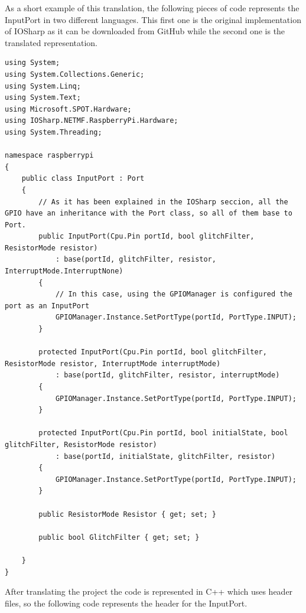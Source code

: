As a short example of this translation, the following pieces of code represents the InputPort in two different languages. This first one is the original implementation of IOSharp as it can be downloaded from GitHub while the second one is the translated representation.
\begin{lstlisting}[language=CSharp, caption={InputPort in C\#}]
using System;
using System.Collections.Generic;
using System.Linq;
using System.Text;
using Microsoft.SPOT.Hardware;
using IOSharp.NETMF.RaspberryPi.Hardware;
using System.Threading;

namespace raspberrypi
{
    public class InputPort : Port
    {
    	// As it has been explained in the IOSharp seccion, all the GPIO have an inheritance with the Port class, so all of them base to Port.
        public InputPort(Cpu.Pin portId, bool glitchFilter, ResistorMode resistor)
            : base(portId, glitchFilter, resistor, InterruptMode.InterruptNone)
        {
        	// In this case, using the GPIOManager is configured the port as an InputPort
            GPIOManager.Instance.SetPortType(portId, PortType.INPUT);
        }

        protected InputPort(Cpu.Pin portId, bool glitchFilter, ResistorMode resistor, InterruptMode interruptMode)
            : base(portId, glitchFilter, resistor, interruptMode)
        {
            GPIOManager.Instance.SetPortType(portId, PortType.INPUT);
        }

        protected InputPort(Cpu.Pin portId, bool initialState, bool glitchFilter, ResistorMode resistor)
            : base(portId, initialState, glitchFilter, resistor)
        {
            GPIOManager.Instance.SetPortType(portId, PortType.INPUT);
        }

        public ResistorMode Resistor { get; set; }

        public bool GlitchFilter { get; set; }

    }
}
\end{lstlisting}
After translating the project the code is represented in C++ which uses header files, so the following code represents the header for the InputPort.
